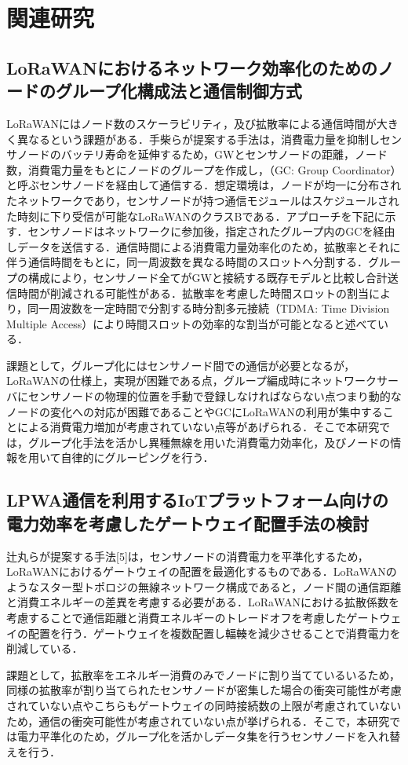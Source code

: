 \chapter{関連研究}

\section{LoRaWANにおけるネットワーク効率化のためのノードのグループ化構成法と通信制御方式}
LoRaWANにはノード数のスケーラビリティ，及び拡散率による通信時間が大きく異なるという課題がある．手柴らが提案する手法\cite{Obana2018}は，消費電力量を抑制しセンサノードのバッテリ寿命を延伸するため，GWとセンサノードの距離，ノード数，消費電力量をもとにノードのグループを作成し，（GC: Group Coordinator）と呼ぶセンサノードを経由して通信する．想定環境は，ノードが均一に分布されたネットワークであり，センサノードが持つ通信モジュールはスケジュールされた時刻に下り受信が可能なLoRaWANのクラスBである．アプローチを下記に示す．センサノードはネットワークに参加後，指定されたグループ内のGCを経由しデータを送信する．通信時間による消費電力量効率化のため，拡散率とそれに伴う通信時間をもとに，同一周波数を異なる時間のスロットへ分割する．グループの構成により，センサノード全てがGWと接続する既存モデルと比較し合計送信時間が削減される可能性がある．拡散率を考慮した時間スロットの割当により，同一周波数を一定時間で分割する時分割多元接続（TDMA: Time Division Multiple Access）により時間スロットの効率的な割当が可能となると述べている．
\par
課題として，グループ化にはセンサノード間での通信が必要となるが，LoRaWANの仕様上，実現が困難である点，グループ編成時にネットワークサーバにセンサノードの物理的位置を手動で登録しなければならない点つまり動的なノードの変化への対応が困難であることやGCにLoRaWANの利用が集中することによる消費電力増加が考慮されていない点等があげられる．そこで本研究では，グループ化手法を活かし異種無線を用いた消費電力効率化，及びノードの情報を用いて自律的にグルーピングを行う．

\section{LPWA通信を利用するIoTプラットフォーム向けの電力効率を考慮したゲートウェイ配置手法の検討}
辻丸らが提案する手法[5]は，センサノードの消費電力を平準化するため，LoRaWANにおけるゲートウェイの配置を最適化するものである．LoRaWANのようなスター型トポロジの無線ネットワーク構成であると，ノード間の通信距離と消費エネルギーの差異を考慮する必要がある．LoRaWANにおける拡散係数を考慮することで通信距離と消費エネルギーのトレードオフを考慮したゲートウェイの配置を行う．ゲートウェイを複数配置し輻輳を減少させることで消費電力を削減している．
\par
課題として，拡散率をエネルギー消費のみでノードに割り当てているいるため，同様の拡散率が割り当てられたセンサノードが密集した場合の衝突可能性が考慮されていない点やこちらもゲートウェイの同時接続数の上限が考慮されていないため，通信の衝突可能性が考慮されていない点が挙げられる．そこで，本研究では電力平準化のため，グループ化を活かしデータ集を行うセンサノードを入れ替えを行う．

